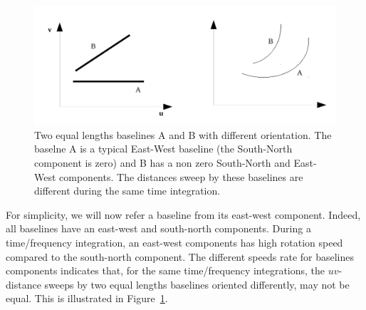 \documentclass[useAMS,usenatbib]{mn2e}
\begin{document}
\begin{figure}
\includegraphics[width=\columnwidth]{./Figures/bda_east_west_two.pdf}
\caption{Two equal lengths baselines A and B with different orientation. The baselne A is a typical
East-West baseline (the South-North component is zero) and B has a non zero South-North and East-West components.
The distances sweep by these baselines
are different during the same time integration.}\label{fig:east_west}
\end{figure}

For simplicity,  we will now refer a baseline from its east-west component. Indeed, all 
baselines have an east-west  and south-north components. During a time/frequency integration, an east-west components has high
rotation speed  compared to the south-north component. The different speeds rate for baselines components indicates that, 
for the same time/frequency integrations, the $uv$-distance sweeps by two equal lengths baselines
oriented differently, may not be equal. This is illustrated
in Figure~\ref{fig:east_west}.
\end{document}
